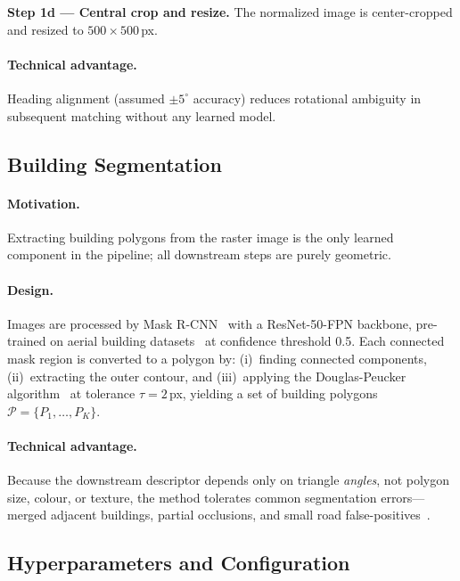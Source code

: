 \documentclass[10pt]{article}
\theoremstyle{plain}
\theoremstyle{definition}
\begin{document}
\noindent\textbf{Step 1d --- Central crop and resize.}
The normalized image is center-cropped and resized to $500\!\times\!500$\,px.

\paragraph{Technical advantage.}
Heading alignment (assumed $\pm5^\circ$ accuracy) reduces rotational ambiguity
in subsequent matching without any learned model.

\subsection{Building Segmentation}
\label{sec:seg}

\paragraph{Motivation.}
Extracting building polygons from the raster image is the only learned
component in the pipeline; all downstream steps are purely geometric.

\paragraph{Design.}
Images are processed by Mask R-CNN~\cite{he2017maskrcnn} with a ResNet-50-FPN
backbone, pre-trained on aerial building
datasets~\cite{ji2018building,fang2021building} at confidence threshold 0.5.
Each connected mask region is converted to a polygon by: (i)~finding connected
components, (ii)~extracting the outer contour, and (iii)~applying the
Douglas-Peucker algorithm~\cite{hershberger1992douglas} at tolerance
$\tau=2$\,px, yielding a set of building polygons
$\mathcal{P} = \{P_1,\ldots,P_K\}$.

\paragraph{Technical advantage.}
Because the downstream descriptor depends only on triangle \emph{angles}, not
polygon size, colour, or texture, the method tolerates common segmentation
errors---merged adjacent buildings, partial occlusions, and small road
false-positives~\cite{ouyang2024cfbvm}.

\subsection{Hyperparameters and Configuration}
\label{sec:hyper}
\end{document}
